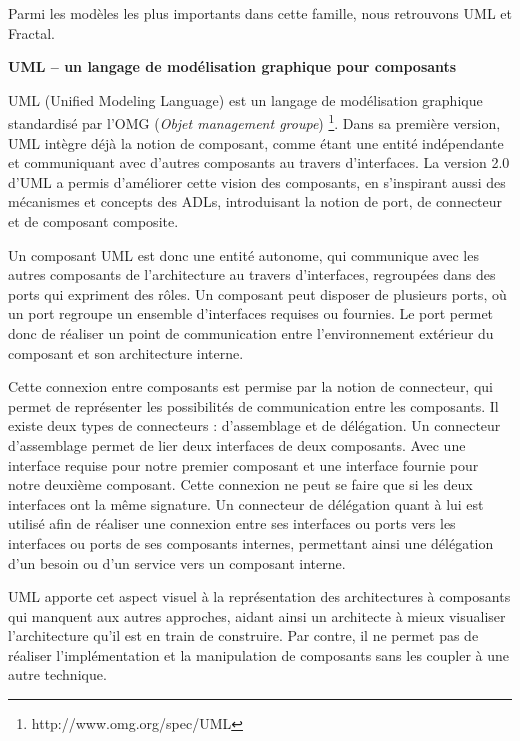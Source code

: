       Parmi les modèles les plus importants dans cette famille, nous retrouvons UML et Fractal. \\\par
      
          \textbf{UML -- un langage de modélisation graphique pour composants}
      
      UML (Unified Modeling Language) est un langage de modélisation graphique standardisé par l'OMG (\emph{Objet management groupe}) \footnote{http://www.omg.org/spec/UML}. Dans sa première version, UML intègre déjà la notion de composant, comme étant une entité indépendante et communiquant avec d'autres composants au travers d'interfaces. La version 2.0 d'UML \cite{specificationuml} a permis d'améliorer cette vision des composants, en s'inspirant aussi des mécanismes et concepts des ADLs, introduisant la notion de port, de connecteur et de composant composite.

Un composant UML est donc une entité autonome, qui communique avec les autres composants de l'architecture au travers d'interfaces, regroupées dans des ports qui expriment des rôles. Un composant peut disposer de plusieurs ports, où un port regroupe un ensemble d'interfaces requises ou fournies. Le port permet donc de réaliser un point de communication entre l'environnement extérieur du composant et son architecture interne. 
      
 Cette connexion entre composants est permise par la notion de connecteur, qui permet de représenter les possibilités de communication entre les composants. Il existe deux types de connecteurs : d’assemblage et de délégation. Un connecteur d'assemblage permet de lier deux interfaces de deux composants. Avec une interface requise pour notre premier composant et une interface fournie pour notre deuxième composant. Cette connexion ne peut se faire que si les deux interfaces ont la même signature. Un connecteur de délégation quant à lui est utilisé afin de réaliser une connexion entre ses interfaces ou ports vers les interfaces ou ports de ses composants internes, permettant ainsi une délégation d'un besoin ou d'un service vers un composant interne.
        
    UML apporte cet aspect visuel à la représentation des architectures à composants qui manquent aux autres approches, aidant ainsi un architecte à mieux visualiser l'architecture qu'il est en train de construire. Par contre, il ne permet pas de réaliser l'implémentation et la manipulation de composants sans les coupler à une autre technique. \\\par 
    
